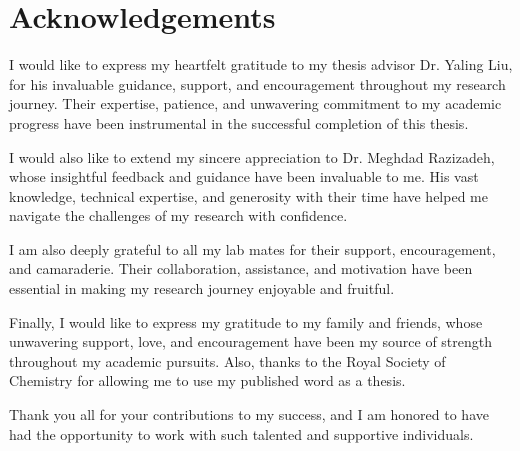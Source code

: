 \chapter*{Acknowledgements} %
I would like to express my heartfelt gratitude to my thesis advisor Dr. Yaling Liu, for his invaluable guidance, support, and encouragement throughout my research journey. Their expertise, patience, and unwavering commitment to my academic progress have been instrumental in the successful completion of this thesis.

I would also like to extend my sincere appreciation to Dr. Meghdad Razizadeh, whose insightful feedback and guidance have been invaluable to me. His vast knowledge, technical expertise, and generosity with their time have helped me navigate the challenges of my research with confidence.

I am also deeply grateful to all my lab mates for their support, encouragement, and camaraderie. Their collaboration, assistance, and motivation have been essential in making my research journey enjoyable and fruitful.

Finally, I would like to express my gratitude to my family and friends, whose unwavering support, love, and encouragement have been my source of strength throughout my academic pursuits. Also, thanks to the Royal Society of Chemistry for allowing me to use my published word as a thesis.

Thank you all for your contributions to my success, and I am honored to have had the opportunity to work with such talented and supportive individuals.
